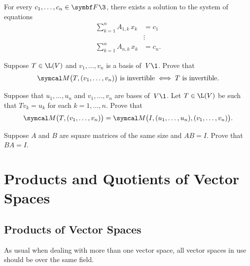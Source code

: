 \begin{exercises}
\begin{subtheorem}
\item
For every $c_1, \dots, c_n \in \F{}\3$, there exists a solution to the system of
equations
\begin{align*}
\sum_{k=1}^n A_{1,k} \, x_k &= c_1 \\
& \vdots \\
\sum_{k=1}^n A_{n,k} \, x_k &= c_n.
\end{align*}
\end{subtheorem}

\exercise
Suppose $T \in \L(V)$ and $v_1, \dots, v_n$ is a basis of~$V\1$.  Prove that
\[
\M\bigl(T, (v_1, \dots, v_n) \bigr) \text{ is invertible} \iff T \text{ is invertible}.
\]
\exercisedisplayend


\exercise
Suppose that $u_1, \dots, u_n$ and $v_1, \dots, v_n$ are bases of~$V\1$.  Let
$T \in \L(V)$ be such that $Tv_k = u_k$ for each
$k = 1, \dots, n$.  Prove that
\[
\M\bigl( T, (v_1, \dots, v_n) \bigr) =
\M\bigl(I, (u_1, \dots, u_n), (v_1, \dots, v_n)\bigr).
\]
\exercisedisplayend


\exercise
Suppose $A$ and $B$ are square matrices of the same size and $AB = I$. Prove that $BA = I$.


\end{exercises}

\section{Products and Quotients of Vector Spaces}
\label{pq}

\subsection{Products of Vector Spaces}

As usual when dealing with more than one vector space, all vector spaces in use should be over the same field.

